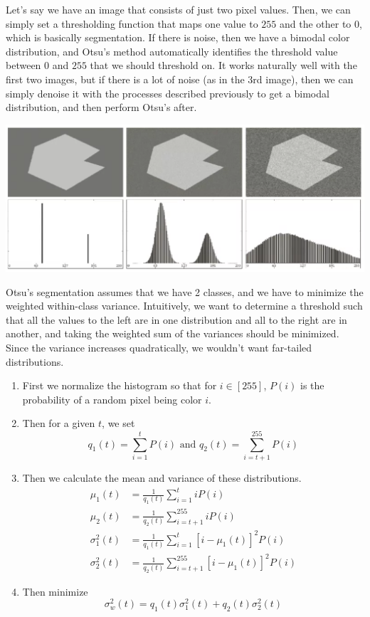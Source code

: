\documentclass{article}
\begin{document}
    Let's say we have an image that consists of just two pixel values. Then, we can simply set a thresholding function that maps one value to $255$ and the other to $0$, which is basically segmentation. If there is noise, then we have a bimodal color distribution, and Otsu's method automatically identifies the threshold value between $0$ and $255$ that we should threshold on. It works naturally well with the first two images, but if there is a lot of noise (as in the 3rd image), then we can simply denoise it with the processes described previously to get a bimodal distribution, and then perform Otsu's after. 
    \begin{center}
        \includegraphics[scale=0.3]{img/otsu1.png}
    \end{center}
    Otsu's segmentation assumes that we have 2 classes, and we have to minimize the weighted within-class variance. Intuitively, we want to determine a threshold such that all the values to the left are in one distribution and all to the right are in another, and taking the weighted sum of the variances should be minimized. Since the variance increases quadratically, we wouldn't want far-tailed distributions. 
    \begin{enumerate}
        \item First we normalize the histogram so that for $i \in [255]$, $P(i)$ is the probability of a random pixel being color $i$. 
        \item Then for a given $t$, we set 
        \[q_1 (t) = \sum_{i=1}^t P(i) \text{ and } q_2 (t) = \sum_{i=t+1}^{255} P(i)\]
        \item Then we calculate the mean and variance of these distributions. 
        \begin{align*}
            \mu_1 (t) & = \frac{1}{q_1 (t)} \sum_{i=1}^t i P(i) \\
            \mu_2 (t) & = \frac{1}{q_2 (t)} \sum_{i=t+1}^{255} i P(i) \\
            \sigma_1^2 (t) & = \frac{1}{q_1 (t)} \sum_{i=1}^t [ i - \mu_1 (t) ]^2 P(i) \\
            \sigma_2^2 (t) & = \frac{1}{q_2 (t)} \sum_{i=t+1}^{255} [ i - \mu_1 (t) ]^2 P(i) 
        \end{align*}
        \item Then minimize 
        \[\sigma_w^2 (t) = q_1 (t) \sigma_1^2 (t) + q_2 (t) \sigma_2^2 (t)\]
    \end{enumerate}
\end{document}
